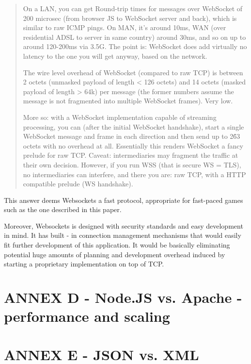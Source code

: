 \documentclass{article}
\begin{document}
\begin{quotation}
On a LAN, you can get Round-trip times for messages over WebSocket of 200
microsec (from browser JS to WebSocket server and back), which is similar to raw
ICMP pings. On MAN, it's around 10ms, WAN (over residential ADSL to server in
same country) around 30ms, and so on up to around 120-200ms via 3.5G. The point
is: WebSocket does add virtually no latency to the one you will get anyway,
based on the network.\newline

The wire level overhead of WebSocket (compared to raw TCP) is between 2 octets
(unmasked payload of length < 126 octets) and 14 octets (masked payload of
length > 64k) per message (the former numbers assume the message is not
fragmented into multiple WebSocket frames). Very low.\newline

More so: with a WebSocket implementation capable of streaming processing, you
can (after the initial WebSocket handshake), start a single WebSocket message
and frame in each direction and then send up to 2\^63 octets with no overhead at
all. Essentially this renders WebSocket a fancy prelude for raw TCP. Caveat:
intermediaries may fragment the traffic at their own decision. However, if you
run WSS (that is secure WS = TLS), no intermediaries can interfere, and there
you are: raw TCP, with a HTTP compatible prelude (WS handshake).
\end{quotation}

This answer deems Websockets a fast protocol, appropriate for fast-paced games
such as the one described in this paper.\newline

Moreover, Websockets is designed with security standards and easy development in
mind. It has built - in connection management mechanisms that would easily fit
further development of this application. It would be basically eliminating
potential huge amounts of planning and development overhead induced by starting
a proprietary implementation on top of TCP. \newline


\section{ANNEX D - Node.JS vs. Apache - performance and scaling}

\section{ANNEX E - JSON vs. XML}
\end{document}
